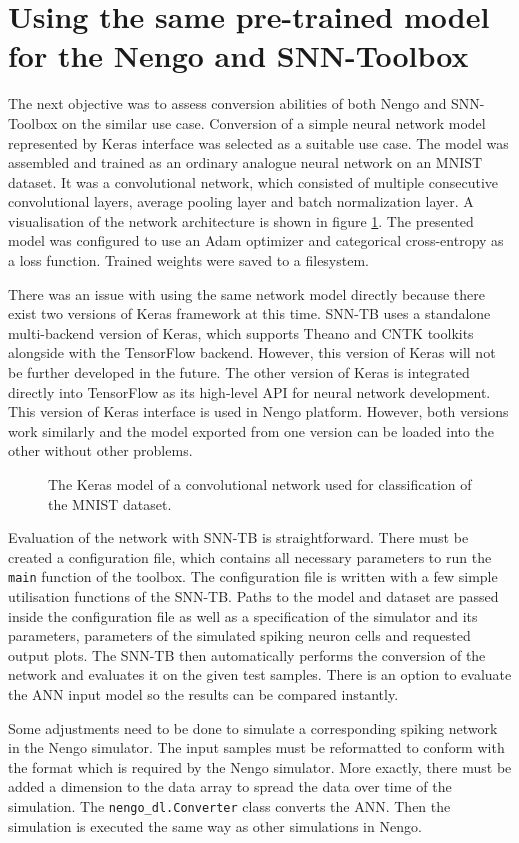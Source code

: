 \section{Using the same pre-trained model for the Nengo and SNN-Toolbox}
The next objective was to assess conversion abilities of both Nengo and SNN-Toolbox on the similar use case. Conversion of a simple neural network model represented by Keras interface was selected as a suitable use case. The model was assembled and trained as an ordinary analogue neural network on an MNIST dataset. It was a convolutional network, which consisted of multiple consecutive convolutional layers, average pooling layer and batch normalization layer. A visualisation of the network architecture is shown in figure \ref{fig:keras_model}. The presented model was configured to use an Adam \cite{kingmaAdamMethod17} optimizer and categorical cross-entropy as a loss function. Trained weights were saved to a filesystem. \par
There was an issue with using the same network model directly because there exist two versions of Keras framework at this time. SNN-TB uses a standalone multi-backend version of Keras, which supports Theano and CNTK toolkits alongside with the TensorFlow backend. However, this version of Keras will not be further developed in the future. The other version of Keras is integrated directly into TensorFlow as its high-level API for neural network development. This version of Keras interface is used in Nengo platform. However, both versions work similarly and the model exported from one version can be loaded into the other without other problems.\par
\begin{figure}[htbp]
    \centering
    
    \caption{The Keras model of a convolutional network used for classification of the MNIST dataset.}
    \label{fig:keras_model}
\end{figure}
Evaluation of the network with SNN-TB is straightforward. There must be created a configuration file, which contains all necessary parameters to run the \texttt{main} function of the toolbox. The configuration file is written with a few simple utilisation functions of the SNN-TB. Paths to the model and dataset are passed inside the configuration file as well as a specification of the simulator and its parameters, parameters of the simulated spiking neuron cells and requested output plots. The SNN-TB then automatically performs the conversion of the network and evaluates it on the given test samples. There is an option to evaluate the ANN input model so the results can be compared instantly. \par
Some adjustments need to be done to simulate a corresponding spiking network in the Nengo simulator. The input samples must be reformatted to conform with the format which is required by the Nengo simulator. More exactly, there must be added a dimension to the data array to spread the data over time of the simulation. The \texttt{nengo\_dl.Converter} class converts the ANN. Then the simulation is executed the same way as other simulations in Nengo.
